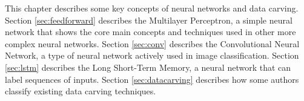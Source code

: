 {\color{red}
This chapter describes some key concepts of neural networks and data carving. Section \ref{sec:feedforward} describes the Multilayer Perceptron, a simple neural network that shows the core main concepts and techniques used in other more complex neural networks. Section \ref{sec:conv} describes the Convolutional Neural Network, a type of neural network actively used in image classification. Section \ref{sec:lstm} describes the Long Short-Term Memory, a neural network that can label sequences of inputs. Section \ref{sec:datacarving} describes how some authors classify existing data carving techniques.
}